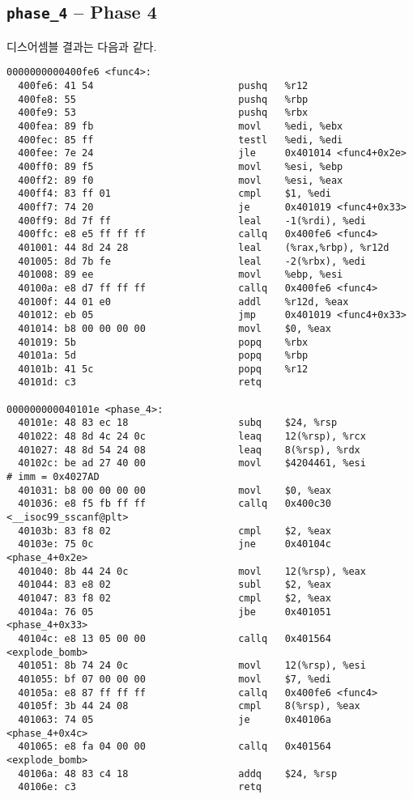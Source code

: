 \documentclass{scrartcl}
\begin{document}
\subsection{\texttt{phase\_4} -- Phase 4}
디스어셈블 결과는 다음과 같다.
\begin{lstlisting}
0000000000400fe6 <func4>:
  400fe6: 41 54                         pushq   %r12
  400fe8: 55                            pushq   %rbp
  400fe9: 53                            pushq   %rbx
  400fea: 89 fb                         movl    %edi, %ebx
  400fec: 85 ff                         testl   %edi, %edi
  400fee: 7e 24                         jle     0x401014 <func4+0x2e>
  400ff0: 89 f5                         movl    %esi, %ebp
  400ff2: 89 f0                         movl    %esi, %eax
  400ff4: 83 ff 01                      cmpl    $1, %edi
  400ff7: 74 20                         je      0x401019 <func4+0x33>
  400ff9: 8d 7f ff                      leal    -1(%rdi), %edi
  400ffc: e8 e5 ff ff ff                callq   0x400fe6 <func4>
  401001: 44 8d 24 28                   leal    (%rax,%rbp), %r12d
  401005: 8d 7b fe                      leal    -2(%rbx), %edi
  401008: 89 ee                         movl    %ebp, %esi
  40100a: e8 d7 ff ff ff                callq   0x400fe6 <func4>
  40100f: 44 01 e0                      addl    %r12d, %eax
  401012: eb 05                         jmp     0x401019 <func4+0x33>
  401014: b8 00 00 00 00                movl    $0, %eax
  401019: 5b                            popq    %rbx
  40101a: 5d                            popq    %rbp
  40101b: 41 5c                         popq    %r12
  40101d: c3                            retq

000000000040101e <phase_4>:
  40101e: 48 83 ec 18                   subq    $24, %rsp
  401022: 48 8d 4c 24 0c                leaq    12(%rsp), %rcx
  401027: 48 8d 54 24 08                leaq    8(%rsp), %rdx
  40102c: be ad 27 40 00                movl    $4204461, %esi          # imm = 0x4027AD
  401031: b8 00 00 00 00                movl    $0, %eax
  401036: e8 f5 fb ff ff                callq   0x400c30 <__isoc99_sscanf@plt>
  40103b: 83 f8 02                      cmpl    $2, %eax
  40103e: 75 0c                         jne     0x40104c <phase_4+0x2e>
  401040: 8b 44 24 0c                   movl    12(%rsp), %eax
  401044: 83 e8 02                      subl    $2, %eax
  401047: 83 f8 02                      cmpl    $2, %eax
  40104a: 76 05                         jbe     0x401051 <phase_4+0x33>
  40104c: e8 13 05 00 00                callq   0x401564 <explode_bomb>
  401051: 8b 74 24 0c                   movl    12(%rsp), %esi
  401055: bf 07 00 00 00                movl    $7, %edi
  40105a: e8 87 ff ff ff                callq   0x400fe6 <func4>
  40105f: 3b 44 24 08                   cmpl    8(%rsp), %eax
  401063: 74 05                         je      0x40106a <phase_4+0x4c>
  401065: e8 fa 04 00 00                callq   0x401564 <explode_bomb>
  40106a: 48 83 c4 18                   addq    $24, %rsp
  40106e: c3                            retq
\end{lstlisting}
\end{document}
